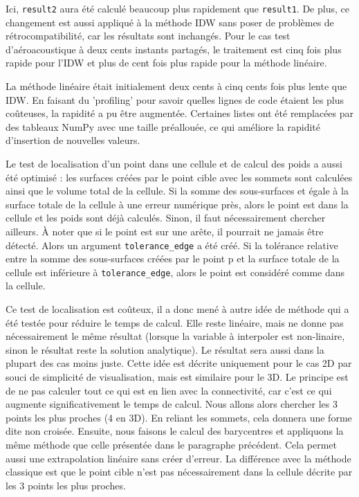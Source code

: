 Ici, \texttt{result2} aura été calculé beaucoup plus rapidement que \texttt{result1}. De plus, ce changement est aussi appliqué à la méthode IDW sans poser de problèmes de rétrocompatibilité, car les résultats sont inchangés. Pour le cas test d'aéroacoustique à deux cents instants partagés, le traitement est cinq fois plus rapide pour l'IDW et plus de cent fois plus rapide pour la méthode linéaire.


La méthode linéaire était initialement deux cents à cinq cents fois plus lente que IDW. En faisant du 'profiling' pour savoir quelles lignes de code étaient les plus coûteuses, la rapidité a pu être augmentée. Certaines listes ont été remplacées par des tableaux NumPy avec une taille préallouée, ce qui améliore la rapidité d'insertion de nouvelles valeurs.

Le test de localisation d'un point dans une cellule et de calcul des poids a aussi été optimisé : les surfaces créées par le point cible avec les sommets sont calculées ainsi que le volume total de la cellule. Si la somme des sous-surfaces et égale à la surface totale de la cellule à une erreur numérique près, alors le point est dans la cellule et les poids sont déjà calculés. Sinon, il faut nécessairement chercher ailleurs. À noter que si le point est sur une arête, il pourrait ne jamais être détecté. Alors un argument \texttt{tolerance\_edge} a été créé. Si la tolérance relative entre la somme des sous-surfaces créées par le point p et la surface totale de la cellule est inférieure à \texttt{tolerance\_edge}, alors le point est considéré comme dans la cellule. %

Ce test de localisation est coûteux, il a donc mené à autre idée de méthode qui a été testée pour réduire le temps de calcul. Elle reste linéaire, mais ne donne pas nécessairement le même résultat (lorsque la variable à interpoler est non-linaire, sinon le résultat reste la solution analytique). Le résultat sera aussi dans la plupart des cas moins juste. Cette idée est décrite uniquement pour le cas 2D par souci de simplicité de visualisation, mais est similaire pour le 3D.
Le principe est de ne pas calculer tout ce qui est en lien avec la connectivité, car c'est ce qui augmente significativement le temps de calcul.
Nous allons alors chercher les 3 points les plus proches (4 en 3D). En reliant les sommets, cela donnera une forme dite non croisée. 
Ensuite, nous faisons le calcul des barycentres et appliquons la même méthode que celle présentée dans le paragraphe précédent. Cela permet aussi une extrapolation linéaire sans créer d'erreur.
La différence avec la méthode classique est que le point cible n'est pas nécessairement dans la cellule décrite par les 3 points les plus proches.


